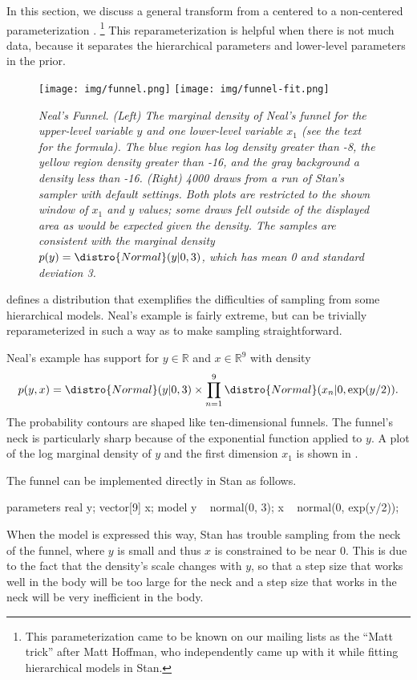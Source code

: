 In this section, we discuss a general transform from a centered to a
non-centered parameterization \cite{papa-et-al:2007}.%
%
\footnote{This parameterization came to be known on our mailing lists
  as the ``Matt trick'' after Matt Hoffman, who independently came up
  with it while fitting hierarchical models in Stan.}
%
This reparameterization is helpful when there is not much data,
because it separates the hierarchical parameters and lower-level
parameters in the prior.
%
\begin{figure}[t]
\vspace*{-6pt}
\begin{center}
\texttt{[image: img/funnel.png]}
\texttt{[image: img/funnel-fit.png]}
\end{center}
\vspace*{-18pt}
\caption{\small\it Neal's Funnel.  (Left) The marginal density of
  Neal's funnel for the upper-level variable $y$ and one lower-level
  variable $x_1$ (see the text for the formula).  The blue region has
  log density greater than -8, the yellow region density greater than
  -16, and the gray background a density less than -16.  
  (Right) 4000 draws from a run of Stan's
  sampler with default settings.  Both plots are restricted to the
  shown window of $x_1$ and $y$ values; some draws fell outside of
  the displayed area as would be expected given the density.  The samples are
  consistent with the marginal density $p(y) =
  \distro{Normal}(y|0,3)$, which has mean 0 and standard deviation
  3.}\label{funnel.figure}
\end{figure}

\citep{Neal:2003} defines a distribution that exemplifies the
difficulties of sampling from some hierarchical models.  Neal's
example is fairly extreme, but can be trivially reparameterized in
such a way as to make sampling straightforward.

Neal's example has support for $y \in
\mathbb{R}$ and  $x \in \mathbb{R}^9$ with density
%
\[
p(y,x) = \distro{Normal}(y|0,3) \times \prod_{n=1}^9
\distro{Normal}(x_n|0,\exp(y/2)).
\]
%
The probability contours are shaped like ten-dimensional funnels.  The
funnel's neck is particularly sharp because of the exponential
function applied to $y$.  A plot of the log marginal density of $y$
and the first dimension $x_1$ is shown in .

The funnel can be implemented directly in Stan as follows.
%
\begin{stancode}
parameters {  
  real y;
  vector[9] x;
}
model {
  y ~ normal(0, 3);
  x ~ normal(0, exp(y/2));
}
\end{stancode}
%
When the model is expressed this way, Stan has trouble sampling from
the neck of the funnel, where $y$ is small and thus $x$ is constrained
to be near 0.  This is due to the fact that the density's scale
changes with $y$, so that a step size that works well in the body will
be too large for the neck and a step size that works in the neck will be
very inefficient in the body.

